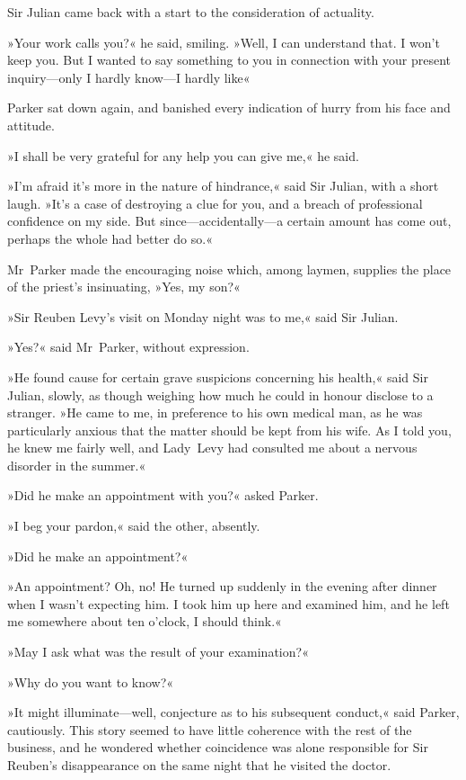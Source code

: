 Sir Julian came back with a start to the consideration of actuality.

»Your work calls you?« he said, smiling. »Well, I can understand that. I won't keep you. But I wanted to say something to you in connection with your present inquiry—only I hardly know—I hardly like\longdash«

Parker sat down again, and banished every indication of hurry from his face and attitude.

»I shall be very grateful for any help you can give me,« he said.

»I'm afraid it's more in the nature of hindrance,« said Sir Julian, with a short laugh. »It's a case of destroying a clue for you, and a breach of professional confidence on my side. But since—accidentally—a certain amount has come out, perhaps the whole had better do so.«

Mr~Parker made the encouraging noise which, among laymen, supplies the place of the priest's insinuating, »Yes, my son?«

»Sir Reuben Levy's visit on Monday night was to me,« said Sir Julian.

»Yes?« said Mr~Parker, without expression.

»He found cause for certain grave suspicions concerning his health,« said Sir Julian, slowly, as though weighing how much he could in honour disclose to a stranger. »He came to me, in preference to his own medical man, as he was particularly anxious that the matter should be kept from his wife. As I told you, he knew me fairly well, and Lady~Levy had consulted me about a nervous disorder in the summer.«

»Did he make an appointment with you?« asked Parker.

»I beg your pardon,« said the other, absently.

»Did he make an appointment?«

»An appointment? Oh, no! He turned up suddenly in the evening after dinner when I wasn't expecting him. I took him up here and examined him, and he left me somewhere about ten o'clock, I should think.«

»May I ask what was the result of your examination?«

»Why do you want to know?«

»It might illuminate—well, conjecture as to his subsequent conduct,« said Parker, cautiously. This story seemed to have little coherence with the rest of the business, and he wondered whether coincidence was alone responsible for Sir Reuben's disappearance on the same night that he visited the doctor.

